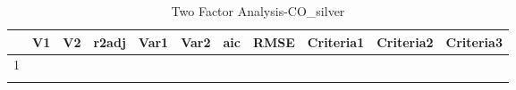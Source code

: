 \begin{longtable}{rllrrrrrlll}
  \hline
 & V1 & V2 & r2adj & Var1 & Var2 & aic & RMSE & Criteria1 & Criteria2 & Criteria3 \\ 
  \hline
1 &  &  &  &  &  &  &  &  &  &  \\ 
   \hline
\hline
\caption{Two Factor Analysis-CO_silver} 
\end{longtable}
